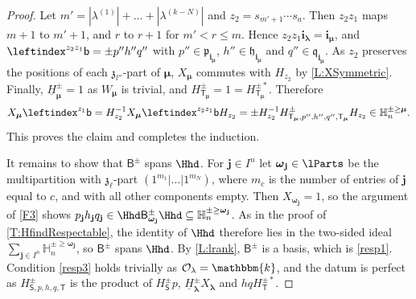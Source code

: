 \documentclass[a4paper,11pt]{amsart}
\newcommand\blam{{\boldsymbol\lambda}}
\newcommand\bmu{{\boldsymbol\mu}}
\newcommand\bom{{\boldsymbol\omega}}
\newcommand\bi{\mathbf{i}}
\newcommand\bj{\mathbf{j}}
\newcommand\ilam[1][\blam]{\bi_{#1}}
\numberwithin{equation}{subsection}
\theoremstyle{definition}
\theoremstyle{theorem}
\theoremstyle{remark}
\newcommand\CO{\mathcal{O}}
\newcommand\kapp{{\mathfrak{z}}}
\newcommand\plam[1][\lambda]{\mathfrak{p}_{#1}}
\newcommand\hlam[1][\lambda]{\mathfrak{h}_{#1}}
\newcommand\qlam[1][\lambda]{\mathfrak{q}_{#1}}
\newcommand\Olam[1][\lambda]{\CO_{#1}}
\newcommand\HH{\mathbb{H}}
\newcommand\HJpm{\underline{H}^\pm}
\newcommand\Sym{W}
\newcommand\Basis[1][\pm]{\mathsf{B}^{#1}}
\newcommand\bb{\mathsf{b}}
\newcommand\bS{{\mathsf{S}}}
\newcommand\bT{{\mathsf{T}}}
\newcommand\Tlam[1][\blam]{{\mathsf{T}_{#1}}}
\newcommand\kk{\mathbbm{k}}
\begin{document}
\begin{proof}
  Let $m'=|\lambda^{(1)}|+\dots+|\lambda^{(k-N)}|$ and $z_2=s_{m'+1}\cdots s_a$. Then $z_2z_1$ maps $m+1$ to $m'+1$, and $r$ to $r+1$ for $m'<r\le m$. Hence $z_2z_1\ilam=\ilam[\bmu]$, and $\leftindex^{z_2z_1}\bb=\pm p''h''q''$ with $p''\in\plam[{\ilam[\bmu]}]$, $h''\in\hlam[{\ilam[\bmu]}]$ and $q''\in\qlam[{\ilam[\bmu]}]$. As $z_2$ preserves the positions of each $\kapp_{l''}$-part of $\bmu$, $X_\bmu$ commutes with $H_{z_2}$ by \autoref{L:XSymmetric}. Finally, $\HJpm_\bmu=1$ as $\Sym_\bmu$ is trivial, and $H^\pm_{\Tlam[\bmu]}=1=H^{\pm*}_{\Tlam[\bmu]}$. Therefore
  \[
    X_\bmu\leftindex^{z_1}\bb=H_{z_2}^{-1}X_\bmu\leftindex^{z_2z_1}\bb H_{z_2}
      =\pm H_{z_2}^{-1}H^\pm_{\Tlam[\bmu],p'',h'',q'',\Tlam[\bmu]}H_{z_2}\in\HH^{\pm\ge\bmu}_n.
  \]
  This proves the claim and completes the induction.

  It remains to show that $\Basis$ spans $\Hhd$. For $\bj\in I^n$ let $\bom_\bj\in\lParts$ be the multipartition with $\kapp_\ell$-part $(1^{m_1}|\dots|1^{m_N})$, where $m_c$ is the number of entries of $\bj$ equal to $c$, and with all other components empty. Then $X_{\bom_\bj}=1$, so the argument of \autoref{F3} shows $p_\bj h_\bj q_\bj\in\Hhd\Basis_{\bom_\bj}\Hhd\subseteq\HH^{\pm\ge\bom_\bj}_n$. As in the proof of \autoref{T:HfindRespectable}, the identity of $\Hhd$ therefore lies in the two-sided ideal $\sum_{\bj\in I^n}\HH^{\pm\ge\bom_\bj}_n$, so $\Basis$ spans $\Hhd$. By \autoref{L:lrank}, $\Basis$ is a basis, which is \autoref{resp1}. Condition \autoref{resp3} holds trivially as $\Olam=\kk$, and the datum is perfect as $H^\pm_{\bS,p,h,q,\bT}$ is the product of $H^\pm_\bS p$, $\HJpm_\blam X_\blam$ and $hqH^{\pm*}_\bT$.
\end{proof}
\end{document}
